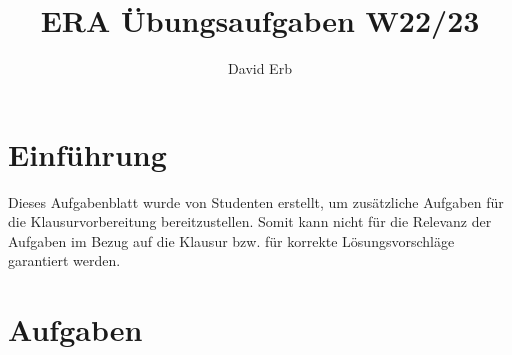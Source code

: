 \documentclass{article}
\title{ERA Übungsaufgaben W22/23}
\author{David Erb}
\begin{document}
\maketitle

\section{Einführung}
Dieses Aufgabenblatt wurde von Studenten erstellt, um zusätzliche Aufgaben für die Klausurvorbereitung bereitzustellen. Somit kann nicht für die Relevanz der Aufgaben im Bezug auf die Klausur bzw. für korrekte Lösungsvorschläge garantiert werden.

\section{Aufgaben}
\end{document}
